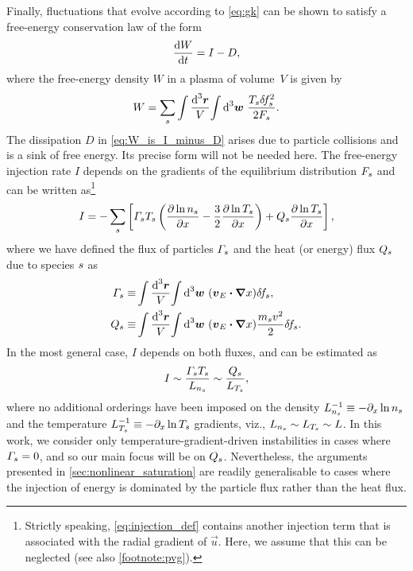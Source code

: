 \documentclass{jpp}
\begin{document}
Finally, fluctuations that evolve according to \cref{eq:gk} can be shown to satisfy a free-energy conservation law \citep{abel13} of the form
\begin{equation}
	\frac{\text{d} W}{\text{d} t} = I - D,
	\label{eq:W_is_I_minus_D}
\end{equation}
where the free-energy density \(W\) in a plasma of volume~\(V\) is given by
\begin{equation}
	W = \sum_s \int \frac{\text{d}^3{\boldsymbol{r}}}{V} {\int \text{d}^{3} \boldsymbol{w} \ } \frac{T_{s} \delta \! f_{s}^2}{2F_{s}}.
	\label{eq:free_energy}
\end{equation}
The dissipation \(D\) in \cref{eq:W_is_I_minus_D} arises due to particle collisions and is a sink of free energy. Its precise form will not be needed here. The free-energy injection rate \(I\) depends on the gradients of the equilibrium distribution \(F_{s}\) and can be written as\footnote{Strictly speaking, \cref{eq:injection_def} contains another injection term that is associated with the radial gradient of \(\vec{u}\). Here, we assume that this can be neglected (see also \cref{footnote:pvg}).}
\begin{equation}
	I = -\sum_s \left[\varGamma_s T_{s} \left(\frac{\partial \ln n_{s}}{\partial x} - \frac{3}{2}\frac{\partial \ln T_{s}}{\partial x}\right) + Q_s \frac{\partial\ln T_{s}}{\partial x}\right] ,
	\label{eq:injection_def}
\end{equation}
where we have defined the flux of particles \(\varGamma_s\) and the heat (or energy) flux \(Q_s\) due to species \(s\) as
\begin{align}
	\varGamma_s \equiv &\int \frac{\text{d}^3 \boldsymbol{r}}{V} {\int \text{d}^{3} \boldsymbol{w} \ } (\boldsymbol{v}_E \boldsymbol{\cdot} {\boldsymbol{\nabla}} x) \delta \! f_{s}, \\
	Q_s \equiv &\int \frac{\text{d}^3 \boldsymbol{r}}{V} {\int \text{d}^{3} \boldsymbol{w} \ } (\boldsymbol{v}_E \boldsymbol{\cdot} {\boldsymbol{\nabla}} x) \frac{m_s v^2}{2} \delta \! f_{s} \label{eq:heatflux_def}.
\end{align}
In the most general case, \(I\) depends on both fluxes, and can be estimated as 
\begin{equation}
	I \sim \frac{\varGamma_s T_{s}}{L_{n_s}}\sim \frac{Q_s}{L_{T_s}},
	\label{eq:injection_as_heatflux}
\end{equation}
where no additional orderings have been imposed on the density \(L_{n_s}^{-1} \equiv - \partial_x \ln n_{s}\) and the temperature \(L_{T_s}^{-1} \equiv -\partial_x \ln T_{s}\) gradients, viz., \mbox{\(L_{n_s} \sim L_{T_s} \sim L\)}. In this work, we consider only temperature-gradient-driven instabilities in cases where \(\varGamma_s=0\), and so our main focus will be on \(Q_s\). Nevertheless, the arguments presented in \cref{sec:nonlinear_saturation} are readily generalisable to cases where the injection of energy is dominated by the particle flux rather than the heat flux.
\end{document}
